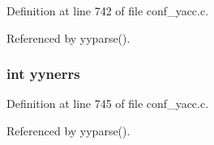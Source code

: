 Definition at line 742 of file conf\_\-yacc.c.

Referenced by yyparse().
\subsubsection{\setlength{\rightskip}{0pt plus 5cm}int {\bf yynerrs}}\label{conf__yacc_8c_a76}




Definition at line 745 of file conf\_\-yacc.c.

Referenced by yyparse().